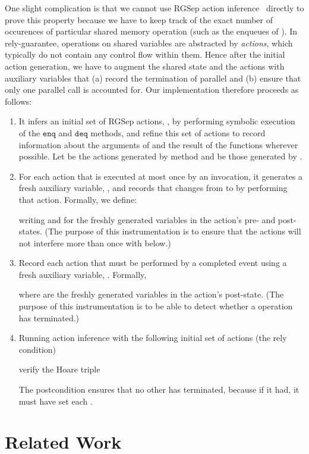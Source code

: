 \documentclass{LMCS}
\newcommand{\enq}{\ensuremath{\mathtt{enq}}}
\newcommand{\deq}{\ensuremath{\mathtt{deq}}}
\begin{document}
One slight complication is that we cannot use RGSep action
inference~\cite{Vaf2010} directly to prove this property because we have to
keep track of the exact number of occurences of particular shared memory
operation (such as the enqueues of ).
In rely-guarantee, operations on shared variables are abstracted by 
\emph{actions}, which typically do not contain any control flow within them. 
Hence after the initial action generation, 
we have to augment the shared state and the actions with 
auxiliary variables that 
(a) record the termination of parallel  and 
(b) ensure that only one parallel  call is accounted for.
Our implementation therefore proceeds as follows:
\begin{enumerate}
\item It infers an initial set of RGSep actions, , by performing symbolic
execution of the {\enq} and {\deq} methods, and refine this set of actions
to record information about the arguments of  and the result of the
 functions wherever possible.
Let  be the actions generated by  method and  be those
generated by .

\item For each action that is executed at most once by an  invocation,
it generates a fresh auxiliary variable, , and records that  changes
from  to  by performing that action.
Formally, we define:

writing  and  for the freshly generated variables in the
action's pre- and post-states.
(The purpose of this instrumentation is to ensure that the  actions will 
not interfere more than once with  below.)

\item Record each action that must be performed by a completed  event
using a fresh auxiliary variable, .  Formally,

where  are the freshly generated variables in the action's
post-state.
(The purpose of this instrumentation is to be able to detect whether a
 operation has terminated.) 

\item 
Running action inference with the following initial set of actions (the rely condition)

verify the Hoare triple

The postcondition ensures that no other  has terminated, because if it
had, it must have set each .
\end{enumerate}





\section{Related Work}
\label{sec:related-work}
\end{document}
